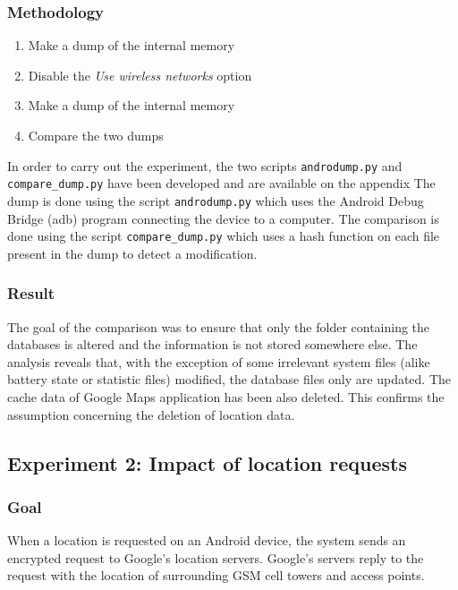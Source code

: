 \subsubsection{Methodology}

\begin{enumerate}
\item Make a dump of the internal memory
\item Disable the \emph{Use wireless networks} option
\item Make a dump of the internal memory
\item Compare the two dumps
\end{enumerate}

In order to carry out the experiment, the two scripts \texttt{androdump.py} and \texttt{compare\_dump.py} have been developed and are available on the appendix %
The dump is done using the script \texttt{androdump.py} which uses the Android Debug Bridge (adb) program connecting the device to a computer.
The comparison is done using the script \texttt{compare\_dump.py} which uses a hash function on each file present in the dump to detect a modification.

\subsubsection{Result}

The goal of the comparison was to ensure that only the folder containing the databases is altered and the information is not stored somewhere else.
The analysis reveals that, with the exception of some irrelevant system files (alike battery state or statistic files) modified, the database files only are updated.
The cache data of Google Maps application has been also deleted.
This confirms the assumption concerning the deletion of location data.\\

\subsection{Experiment 2: Impact of location requests}

\subsubsection{Goal}

When a location is requested on an Android device, the system sends an encrypted request to Google's location servers.
Google's servers reply to the request with the location of surrounding GSM cell towers and access points.\\

